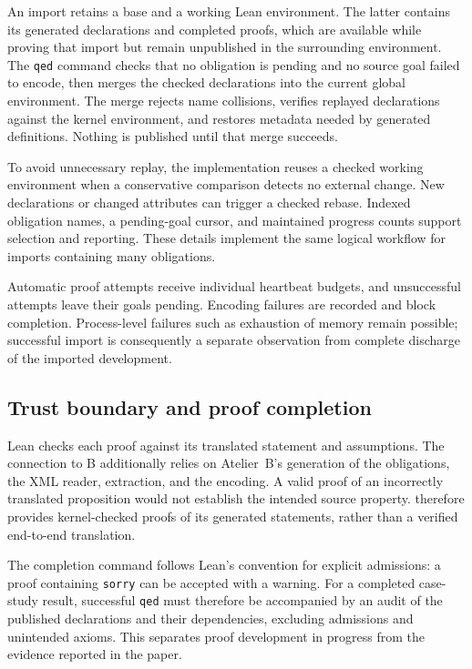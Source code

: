 An import retains a base and a working Lean environment. The latter
contains its generated declarations and completed proofs, which are
available while proving that import but remain unpublished in the
surrounding environment. The \texttt{qed} command checks that no obligation
is pending and no source goal failed to encode, then merges the checked
declarations into the current global environment. The merge rejects
name collisions, verifies replayed declarations against the kernel
environment, and restores metadata needed by generated definitions.
Nothing is published until that merge succeeds.

To avoid unnecessary replay, the implementation reuses a checked working
environment when a conservative comparison detects no external change.
New declarations or changed attributes can trigger a checked rebase.
Indexed obligation names, a pending-goal cursor, and maintained progress
counts support selection and reporting. These details implement the
same logical workflow for imports containing many obligations.

Automatic proof attempts receive individual heartbeat budgets, and
unsuccessful attempts leave their goals pending. Encoding failures are
recorded and block completion. Process-level failures such as exhaustion
of memory remain possible; successful import is consequently a separate
observation from complete discharge of the imported development.

\subsection{Trust boundary and proof completion}

Lean checks each proof against its translated statement and assumptions.
The connection to B additionally relies on Atelier~B's generation of the
obligations, the XML reader, extraction, and the encoding. A valid proof
of an incorrectly translated proposition would not establish the intended
source property. \barrel therefore provides kernel-checked proofs of
its generated statements, rather than a verified end-to-end translation.

The completion command follows Lean's convention for explicit admissions:
a proof containing \texttt{sorry} can be accepted with a warning. For a
completed case-study result, successful \texttt{qed} must therefore be
accompanied by an audit of the published declarations and their
dependencies, excluding admissions and unintended axioms. This separates
proof development in progress from the evidence reported in the paper.
